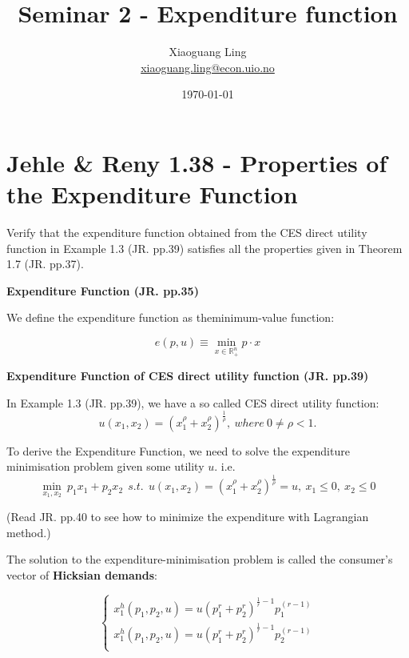 \documentclass{article}
\title{Seminar 2 - Expenditure function}
\author{Xiaoguang Ling \\  \href{xiaoguang.ling@econ.uio.no}{xiaoguang.ling@econ.uio.no}}
\date{\today}
\newcommand{\R}{\mathbb{R}}
\begin{document}
\maketitle

\section{Jehle \& Reny 1.38 - Properties of the Expenditure Function}
Verify that the expenditure function obtained from the CES direct utility function in Example 1.3 
(JR. pp.39) satisfies all the properties given in Theorem 1.7 (JR. pp.37).

\begin{mdframed}[backgroundcolor=blue!20,linecolor=white]

\textbf{Expenditure Function (JR. pp.35)}

\medskip

We define the expenditure function as theminimum-value function:

$$e(p, u) \equiv \min_{x \in \R^n_+} p \cdot x$$

\textbf{Expenditure Function of CES direct utility function (JR. pp.39)}

\medskip

In Example 1.3 (JR. pp.39), we have a so called CES  direct utility function:
$$u(x_1, x_2) = (x_1^{\rho} + x_2^{\rho})^{\frac{1}{\rho}},\ where \ 0 \ne \rho<1.$$

To derive the Expenditure Function, we need to solve the expenditure minimisation problem
given some utility $u$. i.e.
$$\min_{x_1,x_2} \ p_1x_1 + p_2x_2 \ \ s.t.  \ \ u(x_1, x_2) = (x_1^{\rho} + x_2^{\rho})^{\frac{1}{\rho}} = u, \ x_1 \le 0, \ x_2 \le 0$$

(Read JR. pp.40 to see how to minimize the expenditure with Lagrangian method.)

\medskip

The solution to the expenditure-minimisation problem is called the consumer’s
vector of \textbf{Hicksian demands}:

\begin{equation}
    \begin{cases}
    x_1^h(p_1,p_2,u) = u(p_1^{r} + p_2^{r})^{\frac{1}{r}-1} p_1^(r-1) \\	
    x_1^h(p_1,p_2,u) = u(p_1^{r} + p_2^{r})^{\frac{1}{r}-1} p_2^(r-1) \\	
    \end{cases}
    \label{eq:1_38_hicks}   
\end{equation}


\end{mdframed}
\end{document}
